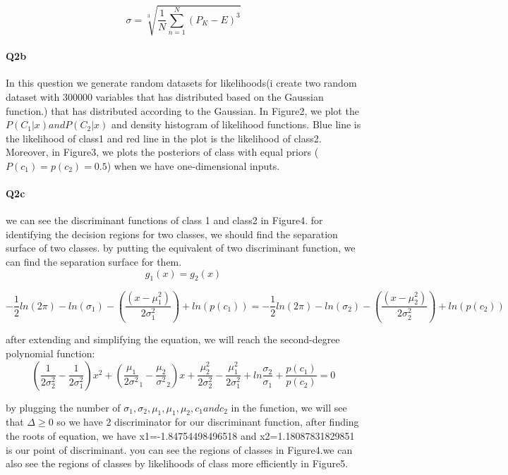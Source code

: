 \documentclass[12pt]{article}
\begin{document}
		
		
		
		\newpage		
		$$\sigma=\sqrt[3]{\dfrac{1}{N} \sum_{n=1}^{N} (P_{K}-E)^3 }$$
				
	\paragraph{Q2b} In this question we generate random datasets for likelihoods(i create two  random dataset with 300000 variables that has distributed based on the Gaussian function.) that has distributed according to the Gaussian. In Figure2, we plot the $P(C_{1}|x) and P(C_{2}|x)$ and density histogram of likelihood functions. Blue line is the likelihood of class1 and red line in the plot is the likelihood of class2. Moreover, in Figure3, we plots the posteriors of class with equal priors ( $P(c_{1})=p(c_{2})=0.5$) when we have one-dimensional inputs.
	

	\paragraph{Q2c} we can see the discriminant functions of class 1 and class2 in Figure4. for identifying the decision regions for two classes, we should find the separation surface of two classes. by putting the equivalent of two discriminant function, we can find the separation surface for them.
			$$g_{1}(x)=g_{2}(x)$$
			
			$$-\frac{1}{2}ln(2\pi)-ln(\sigma_{1})-(\frac{(x-\mu_{1}^{2})}{2\sigma_{1}^{2}})+ln(p(c_{1}))=-\frac{1}{2}ln(2\pi)-ln(\sigma_{2})-(\frac{(x-\mu_{2}^{2})}{2\sigma_{2}^{2}})+ln(p(c_{2}))$$ 
			
after extending and simplifying the equation, we will reach the second-degree polynomial function:		
		  $$(\frac{1}{2\sigma^{2}_{2}}-\frac{1}{2\sigma^{2}_{1}})x^{2}+(\frac{\mu_{1}}{2\sigma^{2}}_{1}-\frac{\mu_{2}}{\sigma^{2}}_{2})x+\frac{\mu^{2}_{2}}{2\sigma^{2}_{2}}-\frac{\mu^{2}_{1}}{2\sigma^{2}_{1}}+ln\frac{\sigma_{2}}{\sigma_{1}}+\frac{p(c_{1})}{p(c_{2})}=0$$
		  
		  
by plugging the number of $\sigma_{1},\sigma_{2},\mu_{1}, \mu_{1},\mu_{2},c_{1} and  c_{2}$ in the function, we will see that $\Delta\geq0$ so we have 2 discriminator for our discriminant function, after finding the roots of equation, we have x1=-1.84754498496518 and x2=1.18087831829851 is our point of discriminant. you can see the regions of classes in Figure4.we can also see the regions of classes by likelihoods of class more efficiently in Figure5.	
			
\end{document}
